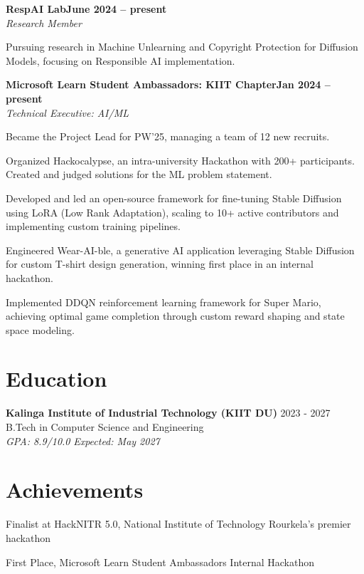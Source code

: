 \documentclass[letterpaper,10pt]{article}
\newcommand{\heading}[2]{
  \hspace{10pt}#1\hfill#2\\
}
\newcommand{\headingBf}[2]{
  \heading{\textbf{#1}}{\textbf{#2}}
}
\newcommand{\headingIt}[2]{
  \heading{\textit{#1}}{\textit{#2}}
}
\newenvironment{resume_list}{
  \vspace{-7pt}
  \begin{itemize}[itemsep=-2px, parsep=1pt, leftmargin=30pt]
}{
  \end{itemize}
  \vspace{-2pt}
}
\begin{document}
  \headingBf{RespAI Lab}{June 2024 -- present}
  \headingIt{Research Member}{}
  \begin{resume_list}
   \item Pursuing research in Machine Unlearning and Copyright Protection for Diffusion Models, focusing on Responsible AI implementation.
  \end{resume_list}

  \headingBf{Microsoft Learn Student Ambassadors: KIIT Chapter}{Jan 2024 -- present}
  \headingIt{Technical Executive: AI/ML }{}
  \begin{resume_list}
    \item Became the Project Lead for PW'25, managing a team of 12 new recruits. 
    \item Organized Hackocalypse, an intra-university Hackathon with 200+ participants. Created and judged solutions for the ML problem statement.
    \item Developed and led an open-source framework for fine-tuning Stable Diffusion using LoRA (Low Rank Adaptation), scaling to 10+ active contributors and implementing custom training pipelines.
    \item Engineered Wear-AI-ble, a generative AI application leveraging Stable Diffusion for custom T-shirt design generation, winning first place in an internal hackathon.
    \item Implemented DDQN reinforcement learning framework for Super Mario, achieving optimal game completion through custom reward shaping and state space modeling.
  \end{resume_list}


\section{Education}
\textbf{Kalinga Institute of Industrial Technology (KIIT DU)} \hfill 2023 - 2027\\
B.Tech in Computer Science and Engineering\\
\textit{GPA: 8.9/10.0} \hfill \textit{Expected: May 2027}


\section{Achievements}
\begin{resume_list}
    \item Finalist at HackNITR 5.0, National Institute of Technology Rourkela's premier hackathon
    \item First Place, Microsoft Learn Student Ambassadors Internal Hackathon
\end{resume_list}
\end{document}
